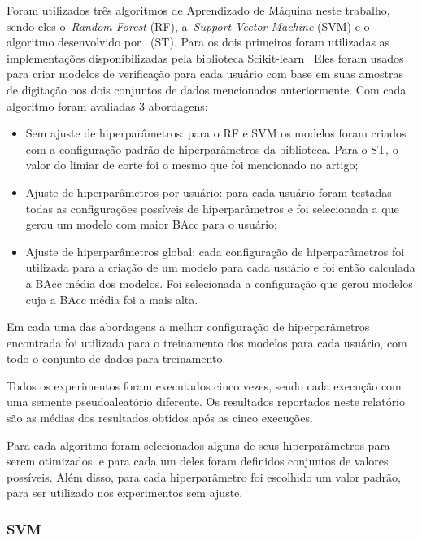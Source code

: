 Foram utilizados três algoritmos de Aprendizado de Máquina neste trabalho, sendo eles o~\textit{Random Forest} (RF), a~\textit{Support Vector Machine} (SVM) e o algoritmo desenvolvido por~ (ST). Para os dois primeiros foram utilizadas as implementações disponibilizadas pela biblioteca Scikit-learn~\cite{scikit-learn} Eles foram usados para criar modelos de verificação para cada usuário com base em suas amostras de digitação nos dois conjuntos de dados mencionados anteriormente. Com cada algoritmo foram avaliadas 3 abordagens:

\begin{itemize}
    \item Sem ajuste de hiperparâmetros: para o RF e SVM os modelos foram criados com a configuração padrão de hiperparâmetros da biblioteca. Para o ST, o valor do limiar de corte foi o mesmo que foi mencionado no artigo;
    \item Ajuste de hiperparâmetros por usuário: para cada usuário foram testadas todas as configurações possíveis de hiperparâmetros e foi selecionada a que gerou um modelo com maior BAcc para o usuário;
    \item Ajuste de hiperparâmetros global: cada configuração de hiperparâmetros foi utilizada para a criação de um modelo para cada usuário e foi então calculada a BAcc média dos modelos. Foi selecionada a configuração que gerou modelos cuja a BAcc média foi a mais alta. 
\end{itemize}

Em cada uma das abordagens a melhor configuração de hiperparâmetros encontrada foi utilizada para o treinamento dos modelos para cada usuário, com todo o conjunto de dados para treinamento.

Todos os experimentos foram executados cinco vezes, sendo cada execução com uma semente pseudoaleatório diferente. Os resultados reportados neste relatório são as médias dos resultados obtidos após as cinco execuções.

Para cada algoritmo foram selecionados alguns de seus hiperparâmetros para serem otimizados, e para cada um deles foram definidos conjuntos de valores possíveis. Além disso, para cada hiperparâmetro foi escolhido um valor padrão, para ser utilizado nos experimentos sem ajuste.


\subsubsection{SVM}\label{subsubsec:svm_hps}


